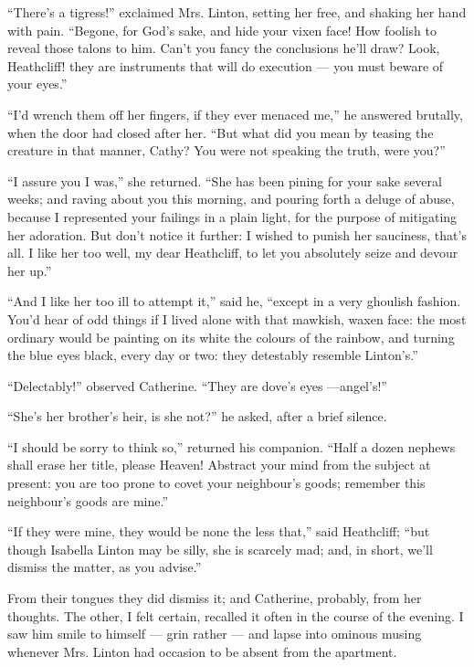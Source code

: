 \par “There's a tigress!” exclaimed Mrs. Linton, setting her free, and shaking her hand with pain. “Begone, for God's sake, and hide your vixen face! How foolish to reveal those talons to him. Can't you fancy the conclusions he'll draw? Look, Heathcliff! they are instruments that will do execution — you must beware of your eyes.”
\par “I'd wrench them off her fingers, if they ever menaced me,” he answered brutally, when the door had closed after her. “But what did you mean by teasing the creature in that manner, Cathy? You were not speaking the truth, were you?”
\par “I assure you I was,” she returned. “She has been pining for your sake several weeks; and raving about you this morning, and pouring forth a deluge of abuse, because I represented your failings in a plain light, for the purpose of mitigating her adoration. But don't notice it further: I wished to punish her sauciness, that's all. I like her too well, my dear Heathcliff, to let you absolutely seize and devour her up.”
\par “And I like her too ill to attempt it,” said he, “except in a very ghoulish fashion. You'd hear of odd things if I lived alone with that mawkish, waxen face: the most ordinary would be painting on its white the colours of the rainbow, and turning the blue eyes black, every day or two: they detestably resemble Linton's.”
\par “Delectably!” observed Catherine. “They are dove's eyes —angel's!”
\par “She's her brother's heir, is she not?” he asked, after a brief silence.
\par “I should be sorry to think so,” returned his companion. “Half a dozen nephews shall erase her title, please Heaven! Abstract your mind from the subject at present: you are too prone to covet your neighbour's goods; remember this neighbour's goods are mine.”
\par “If they were mine, they would be none the less that,” said Heathcliff; “but though Isabella Linton may be silly, she is scarcely mad; and, in short, we'll dismiss the matter, as you advise.”
\par From their tongues they did dismiss it; and Catherine, probably, from her thoughts. The other, I felt certain, recalled it often in the course of the evening. I saw him smile to himself — grin rather — and lapse into ominous musing whenever Mrs. Linton had occasion to be absent from the apartment.
